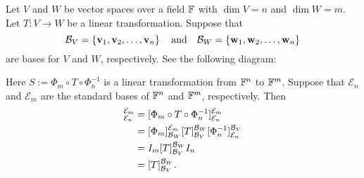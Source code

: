 \documentclass[11pt,openany]{article}
\renewcommand{\vec}[1]{\mathbf{#1}}
\begin{document}
\iffalse
\begin{observation}
Let $V$ and $W$ be vector spaces over a field $\mathbb{F}$ with $\dim V=n$ and $\dim W=m$. Let $T:V\to W$ be a linear transformation. Suppose that \[
\basis_V=\set{\vec{v}_1,\vec{v}_2,\dots,\vec{v}_n}\quad\text{and}\quad\basis_W=\set{\vec{w}_1,\vec{w}_2,\dots,\vec{w}_n}
\] are bases for $V$ and $W$, respectively. See the following diagram:
\begin{center}
\end{center} Here $S:=\Phi_m\circ T\circ \Phi_n^{-1}$ is a linear transformation from $\mathbb{F}^n$ to $\mathbb{F}^m$. Suppose that $\mathcal{E}_n$ and $\mathcal{E}_m$ are the standard bases of $\mathbb{F}^n$ and $\mathbb{F}^m$, respectively. Then \begin{align*}
[S]_{\mathcal{E}_n}^{\mathcal{E}_m} &= [\Phi_m\circ T\circ \Phi_n^{-1}]_{\mathcal{E}_n}^{\mathcal{E}_m}\\
&=[\Phi_m]_{\basis_W}^{\mathcal{E}_m}[T]_{\basis_V}^{\basis_W}[\Phi_n^{-1}]_{\mathcal{E}_n}^{\basis_V}\\
&=I_m[T]_{\basis_V}^{\basis_W}I_n\\
&=[T]_{\basis_V}^{\basis_W}.
\end{align*}
\end{observation}
\end{document}
